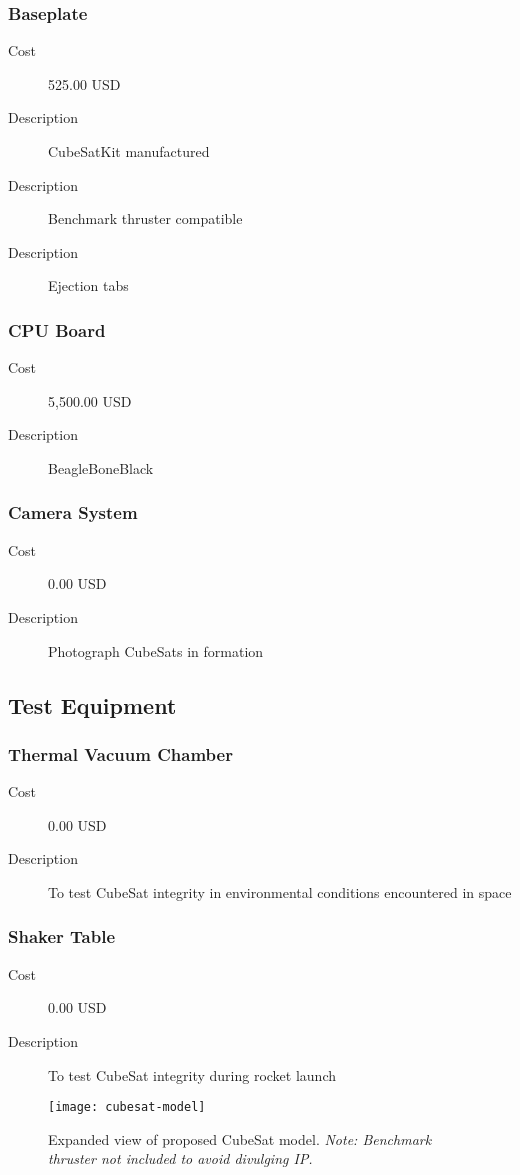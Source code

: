 \subsubsection{Baseplate}
\begin{description}
\item[Cost] 525.00 USD
\item[Description] CubeSatKit manufactured
\item[Description] Benchmark thruster compatible
\item[Description] Ejection tabs
\end{description}

\subsubsection{CPU Board}
\begin{description}
\item[Cost] 5,500.00 USD
\item[Description] BeagleBoneBlack
\end{description}

\subsubsection{Camera System}
\begin{description}
\item[Cost] 0.00 USD
\item[Description] Photograph CubeSats in formation
\end{description}


\subsection{Test Equipment}

\subsubsection{Thermal Vacuum Chamber}
\begin{description}
\item[Cost] 0.00 USD
\item[Description] To test CubeSat integrity in environmental
  conditions encountered in space
\end{description}

\subsubsection{Shaker Table}
\begin{description}
\item[Cost] 0.00 USD
\item[Description] To test CubeSat integrity during rocket launch
\end{description}

\begin{figure}
\centering
\texttt{[image: cubesat-model]}
\caption{Expanded view of proposed CubeSat model. \textit{Note:
    Benchmark thruster not included to avoid divulging IP.}}
\label{fig:cubesat-model}
\end{figure}
